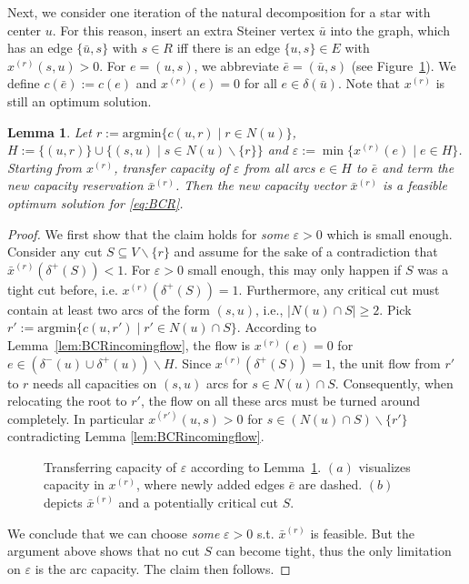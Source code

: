 \documentclass[11pt, letterpaper]{article}
\newtheorem{lemma}[theorem]{Lemma}
\theoremstyle{definition}
\begin{document}
Next, we consider one iteration of the natural decomposition for a star with center $u$. 
For this reason, insert an extra Steiner vertex $\bar{u}$ into the graph, 
which has an edge $\{\bar{u},s\}$ with $s \in R$ iff there is an edge $\{ u,s\} \in E$ with $x^{(r)}(s,u)>0$.
For $e=(u,s)$, we abbreviate $\bar{e} = (\bar{u},s)$ (see Figure~\ref{fig:TransferingCapacity}).
We define  $c(\bar{e}) := c(e)$ and  $x^{(r)}(e) = 0$ for all $e \in \delta(\bar{u})$.
Note that $x^{(r)}$ is still an
optimum solution. 


\begin{lemma} \label{lem:SplittingBCR}
Let $r := \textrm{argmin} \{ c(u,r) \mid r \in N(u) \}$,  $H := \{ (u,r) \} \cup \{ (s,u) \mid s \in N(u) \backslash \{ r\}\}$ and $\varepsilon := \min\{ x^{(r)}(e) \mid e \in H\}$. Starting from  $x^{(r)}$, transfer capacity of $\varepsilon$ from all arcs $e \in H$ to $\bar{e}$ and term the new capacity reservation $\bar{x}^{(r)}$. 
Then the new capacity vector $\bar{x}^{(r)}$ is a feasible optimum solution 
for \eqref{eq:BCR}.
\end{lemma}
\begin{proof}
We first show that the claim holds for \emph{some} $\varepsilon > 0$ which is small enough.
Consider any cut $S \subseteq V \backslash \{ r\}$ and assume for the sake of a contradiction that  $\bar{x}^{(r)}(\delta^+(S)) < 1$.
For $\varepsilon > 0$ small enough, this may only happen if $S$ was a tight cut before, i.e. $x^{(r)}(\delta^+(S)) = 1$.
Furthermore, any critical cut must contain at least two arcs of the 
form $(s,u)$, i.e., $|N(u) \cap S| \geq 2$. Pick $r' := \textrm{argmin}\{ c(u,r') \mid r' \in N(u) \cap S \}$. 
According to Lemma~\ref{lem:BCRincomingflow}, the flow is $x^{(r)}(e) = 0$ for $e \in (\delta^-(u)\cup\delta^+(u))\backslash H$. Since $x^{(r)}(\delta^+(S)) = 1$, the unit flow from $r'$ to $r$ needs all capacities on $(s,u)$
arcs for $s \in N(u) \cap S$. Consequently, when relocating the root to $r'$, the flow
on all these arcs must be turned around completely. In particular $x^{(r')}(u,s)>0$ for $s \in (N(u) \cap S)\backslash\{r'\}$
contradicting Lemma \ref{lem:BCRincomingflow}.
\begin{figure}[H]
\begin{center}
 \hspace{1cm}

\caption{Transferring capacity of $\varepsilon$ according to Lemma~\ref{lem:SplittingBCR}. $(a)$ visualizes capacity in $x^{(r)}$, where newly added edges $\bar{e}$ are dashed. $(b)$ depicts $\bar{x}^{(r)}$ and a potentially critical cut $S$. \label{fig:TransferingCapacity}}
\end{center}
\end{figure}
We conclude that we can choose \emph{some} $\varepsilon > 0$ s.t. $\bar{x}^{(r)}$ is feasible.
But the argument above shows that no cut $S$ can become tight, thus the only limitation on $\varepsilon$
is the arc capacity. The claim then follows. 
\end{proof}
\end{document}
